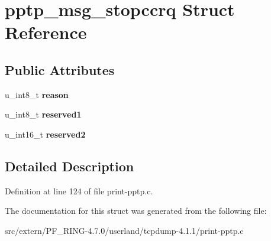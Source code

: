 \hypertarget{structpptp__msg__stopccrq}{
\section{pptp\_\-msg\_\-stopccrq Struct Reference}
\label{structpptp__msg__stopccrq}
}
\subsection*{Public Attributes}
\begin{DoxyCompactItemize}
\item 
\hypertarget{structpptp__msg__stopccrq_aeb64d0a53c1d3b9e512e9503b88d12fe}{
u\_\-int8\_\-t {\bfseries reason}}
\label{structpptp__msg__stopccrq_aeb64d0a53c1d3b9e512e9503b88d12fe}

\item 
\hypertarget{structpptp__msg__stopccrq_a5e0a669d488f5584db662726c83b679d}{
u\_\-int8\_\-t {\bfseries reserved1}}
\label{structpptp__msg__stopccrq_a5e0a669d488f5584db662726c83b679d}

\item 
\hypertarget{structpptp__msg__stopccrq_a4ad58439d3923383a69bf473c9f3322d}{
u\_\-int16\_\-t {\bfseries reserved2}}
\label{structpptp__msg__stopccrq_a4ad58439d3923383a69bf473c9f3322d}

\end{DoxyCompactItemize}


\subsection{Detailed Description}


Definition at line 124 of file print-\/pptp.c.



The documentation for this struct was generated from the following file:\begin{DoxyCompactItemize}
\item 
src/extern/PF\_\-RING-\/4.7.0/userland/tcpdump-\/4.1.1/print-\/pptp.c\end{DoxyCompactItemize}

